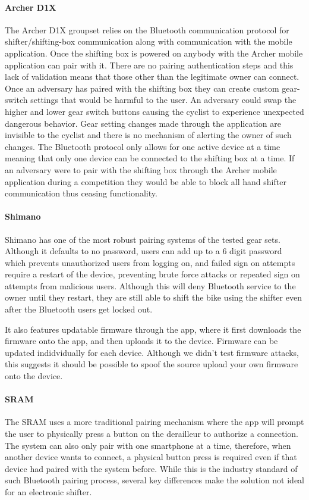 \documentclass[letterpaper,twocolumn,10pt]{article}
\begin{document}
\paragraph{Archer D1X}
The Archer D1X groupset relies on the Bluetooth communication protocol for shifter/shifting-box communication along with communication with the mobile application. Once the shifting box is powered on anybody with the Archer mobile application can pair with it. There are no pairing authentication steps and this lack of validation means that those other than the legitimate owner can connect. Once an adversary has paired with the shifting box they can create custom gear-switch settings that would be harmful to the user. An adversary could swap the higher and lower gear switch buttons causing the cyclist to experience unexpected dangerous behavior. Gear setting changes made through the application are invisible to the cyclist and there is no mechanism of alerting the owner of such changes. The Bluetooth protocol only allows for one active device at a time meaning that only one device can be connected to the shifting box at a time. If an adversary were to pair with the shifting box through the Archer mobile application during a competition they would be able to block all hand shifter communication thus ceasing functionality.

\paragraph{Shimano}
Shimano has one of the most robust pairing systems of the tested gear sets. Although it defaults to no password, users can add up to a 6 digit password which prevents unauthorized users from logging on, and failed sign on attempts require a restart of the device, preventing brute force attacks or repeated sign on attempts from malicious users. Although this will deny Bluetooth service to the owner until they restart, they are still able to shift the bike using the shifter even after the Bluetooth users get locked out.

It also features updatable firmware through the app, where it first downloads the firmware onto the app, and then uploads it to the device. Firmware can be updated indidvidually for each device. Although we didn't test firmware attacks, this suggests it should be possible to spoof the source upload your own firmware onto the device.

\paragraph{SRAM}
The SRAM uses a more traditional pairing mechanism where the app will prompt the user to physically press a button on the derailleur to authorize a connection. The system can also only pair with one smartphone at a time, therefore, when another device wants to connect, a physical button press is required even if that device had paired with the system before. While this is the industry standard of such Bluetooth pairing process, several key differences make the solution not ideal for an electronic shifter.
\end{document}
